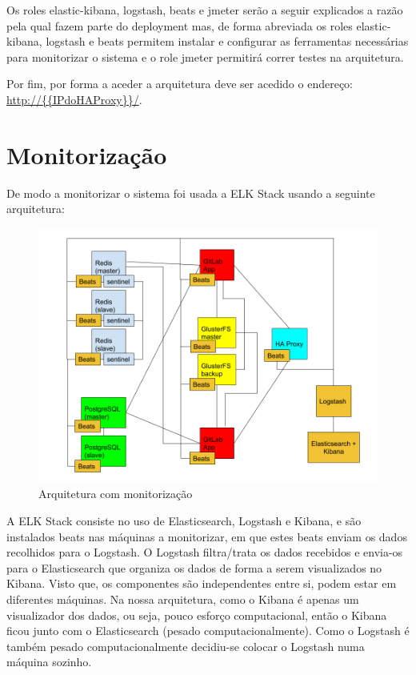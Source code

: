 \documentclass{article}
\begin{document}
Os roles elastic-kibana, logstash, beats e jmeter serão a seguir explicados a razão pela qual fazem parte do deployment mas, de forma abreviada os roles elastic-kibana, logstash e beats permitem instalar e configurar as ferramentas necessárias para monitorizar o sistema e o role jmeter permitirá correr testes na arquitetura.

Por fim, por forma a aceder a arquitetura deve ser acedido o endereço: \url{http://{{IPdoHAProxy}}/}.

\section{Monitorização} \label{Mon}

De modo a monitorizar o sistema foi usada a ELK Stack usando a seguinte arquitetura:

\begin{figure}[H]
    \centering
    \includegraphics[width=15cm]{archMon.png}
    \caption{Arquitetura com monitorização}
    \label{fig:archBase}
\end{figure}
A ELK Stack consiste no uso de Elasticsearch, Logstash e Kibana, e são instalados beats nas máquinas a monitorizar, em que estes beats enviam os dados recolhidos para o Logstash. O Logstash filtra/trata os dados recebidos e envia-os para o Elasticsearch que organiza os dados de forma a serem visualizados no Kibana. Visto que, os componentes são independentes entre si, podem estar em diferentes máquinas. Na nossa arquitetura, como o Kibana é apenas um visualizador dos dados, ou seja, pouco esforço computacional, então o Kibana ficou junto com o Elasticsearch (pesado computacionalmente). Como o Logstash é também pesado computacionalmente decidiu-se colocar o Logstash numa máquina sozinho.
\end{document}
